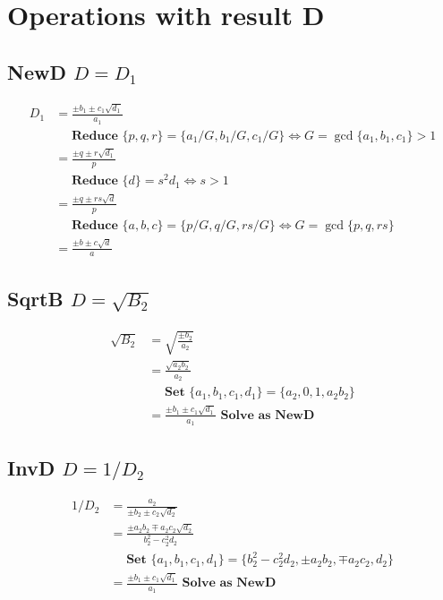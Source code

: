 \documentclass{article}
\begin{document}
\section{Operations with result D}

\subsection{NewD $D = D_1$}
\begin{align}
D_1 &= \frac{\pm b_1 \pm c_1\sqrt{d_1}}{a_1}\\
 &\quad \textbf{ Reduce } \{p,q,r\} = \{a_1/G,b_1/G,c_1/G\} \iff G = \gcd \{a_1,b_1,c_1\} > 1 \nonumber \\
 &= \frac{\pm q \pm r\sqrt{d_1}}{p} \\
 &\quad \textbf{ Reduce } \{ d \} = s^2d_1 \iff s>1 \nonumber \\
 &= \frac{\pm q \pm rs\sqrt{d}}{p}\\
 &\quad \textbf{ Reduce } \{a,b,c\} = \{p/G,q/G,rs/G\} \iff G = \gcd \{p,q,rs\} \nonumber \\
 &= \frac{\pm b \pm c\sqrt{d}}{a}
\end{align}

\subsection{SqrtB $D = \sqrt{B_2}$}
\begin{align}
\sqrt{B_2} &= \sqrt{\frac{\pm b_2}{a_2}}\\
 &= \frac{\sqrt{a_2b_2}}{a_2}\\
 &\quad \textbf{ Set } \{ a_1, b_1, c_1, d_1\} = \{ a_2, 0, 1, a_2b_2\} \nonumber \\
 &= \frac{\pm b_1 \pm c_1\sqrt{d_1}}{a_1} \textbf{ Solve as NewD }
\end{align}

\subsection{InvD $D = 1 / D_2$}
\begin{align*}
1 / D_2 &= \frac{a_2}{\pm b_2 \pm c_2\sqrt{d_2}} \\
 &= \frac{\pm a_2b_2 \mp a_2c_2\sqrt{d_2}}{b_2^2 - c_2^2d_2}\\
 &\quad \textbf{ Set } \{ a_1, b_1, c_1, d_1\} = \{ b_2^2 - c_2^2d_2, \pm a_2b_2, \mp a_2c_2, d_2\} \nonumber\\
 &= \frac{\pm b_1 \pm c_1\sqrt{d_1}}{a_1} \textbf{ Solve as NewD } \nonumber
\end{align*}
\end{document}

